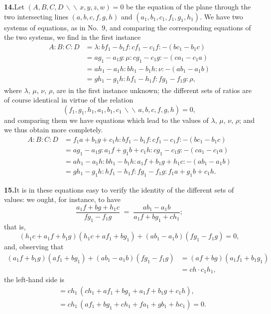 \documentclass[11pt,a4paper]{article}
\begin{document}
\textbf{14.}\quad Let $(A, B, C, D \,\backslash\!\!\backslash\, x, y, z, w) = 0$ be the
equation of the plane through the two intersecting lines $(a, b, c, f, g, h)$
and $(a_{1}, b_{1}, c_{1}, f_{1}, g_{1}, h_{1})$. We have two systems of
equations, as in No.~9, and comparing the corresponding equations of the two
systems, we find in the first instance
\begin{align*}
A : B : C : D &= \lambda : b f_{1} - b_{1} f : c f_{1} - c_{1} f : -(b c_{1} - b_{1} c) \\
              &= a g_{1} - a_{1} g : \mu : c g_{1} - c_{1} g : -(c a_{1} - c_{1} a) \\
              &= a h_{1} - a_{1} h : b h_{1} - b_{1} h : \nu : -(a b_{1} - a_{1} b) \\
              &= g h_{1} - g_{1} h : h f_{1} - h_{1} f : f g_{1} - f_{1} g : \rho,
\end{align*}
where $\lambda$, $\mu$, $\nu$, $\rho$, are in the first instance unknown; the
different sets of ratios are of course identical in virtue of the relation
\[
(f_{1}, g_{1}, h_{1}, a_{1}, b_{1}, c_{1} \,\backslash\!\!\backslash\, a, b, c, f, g, h) = 0,
\]
and comparing them we have equations which lead to the values of $\lambda$,
$\mu$, $\nu$, $\rho$; and we thus obtain more completely.
\begin{align*}
A : B : C : D &= f_{1} a + b_{1} g + c_{1} h : b f_{1} - b_{1} f : c f_{1} - c_{1} f : -(b c_{1} - b_{1} c) \\
              &= a g_{1} - a_{1} g : a_{1} f + g_{1} b + c_{1} h : c g_{1} - c_{1} g : -(c a_{1} - c_{1} a) \\
              &= a h_{1} - a_{1} h : b h_{1} - b_{1} h : a_{1} f + b_{1} g + h_{1} c : -(a b_{1} - a_{1} b) \\
              &= g h_{1} - g_{1} h : h f_{1} - h_{1} f : f g_{1} - f_{1} g : f_{1} a + g_{1} b + c_{1} h.
\end{align*}

\textbf{15.}\quad It is in these equations easy to verify the identity of the
different sets of values: we ought, for instance, to have
\[
\frac{a_{1} f + b g + h_{1} c}{f g_{1} - f_{1} g} \;=\; \frac{a b_{1} - a_{1} b}{a_{1} f + b g_{1} + c h_{1}};
\]
that is,
\[
(h_{1} c + a_{1} f + b_{1} g)(h_{1} c + a f_{1} + b g_{1}) + (a b_{1} - a_{1} b)(f g_{1} - f_{1} g) = 0,
\]
and, observing that
\begin{align*}
(a_{1} f + b_{1} g)(a f_{1} + b g_{1}) + (a b_{1} - a_{1} b)(f g_{1} - f_{1} g)
   &= (a f + b g)(a_{1} f_{1} + b_{1} g_{1}) \\
   &= c h \cdot c_{1} h_{1},
\end{align*}
the left-hand side is
\begin{align*}
   &= c h_{1}\,(c h_{1} + a f_{1} + b g_{1} + a_{1} f + b_{1} g + c_{1} h), \\
   &= c h_{1}\,(a f_{1} + b g_{1} + c h_{1} + f a_{1} + g b_{1} + h c_{1}) = 0.
\end{align*}
\end{document}
